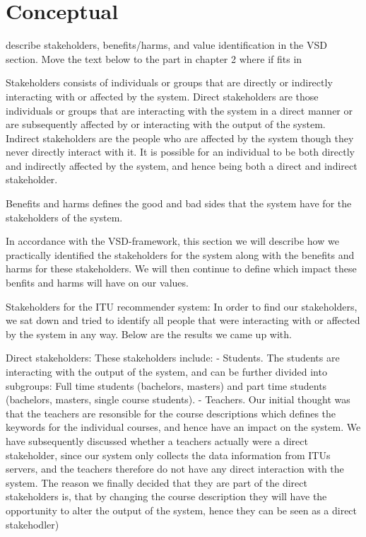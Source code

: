 \section{Conceptual}

describe stakeholders, benefits/harms, and value identification in the VSD section. Move the text below to the part in chapter 2 where if fits in\newline

Stakeholders consists of individuals or groups that are directly or indirectly interacting with or affected by the system. Direct stakeholders are those individuals or groups that are interacting with the system in a direct manner or are subsequently affected by or interacting with the output of the system. Indirect stakeholders are the people who are affected by the system though they never directly interact with it. It is possible for an individual to be both directly and indirectly affected by the system, and hence being both a direct and indirect stakeholder.


Benefits and harms defines the good and bad sides that the system have for the stakeholders of the system.


In accordance with the VSD-framework, this section we will describe how we practically identified the stakeholders for the system along with the benefits and harms for these stakeholders. We will then continue to define which impact these benfits and harms will have on our values.


Stakeholders for the ITU recommender system:
In order to find our stakeholders, we sat down and tried to identify all people that were interacting with or affected by the system in any way. Below are the results we came up with.

Direct stakeholders:  These stakeholders include:
- Students. The students are interacting with the output of the system, and can be further divided into subgroups: Full time students (bachelors, masters) and part time students (bachelors, masters, single course students).
- Teachers. Our initial thought was that the teachers are resonsible for the course descriptions which defines the keywords for the individual courses, and hence have an impact on the system. We have subsequently discussed whether a teachers actually were a direct stakeholder, since our system only collects the data information from ITUs servers, and the teachers therefore do not have any direct interaction with the system. The reason we finally decided that they are part of the direct stakeholders is, that by changing the course description they will have the opportunity to alter the output of the system, hence they can be seen as a direct stakehodler)


